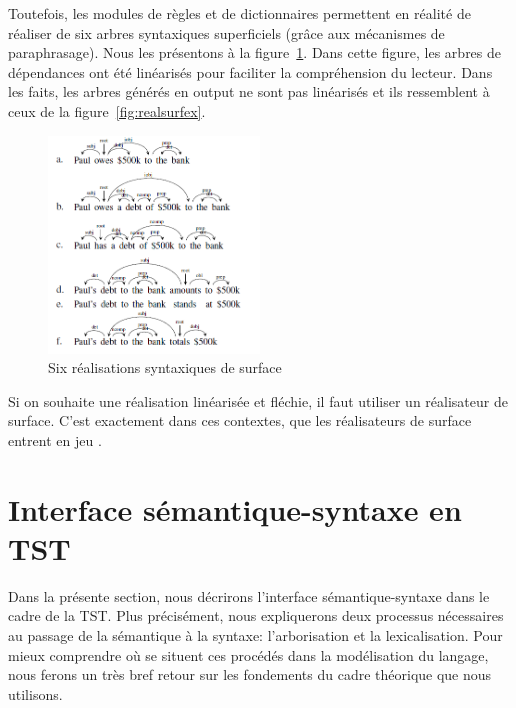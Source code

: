 Toutefois, les modules de règles et de dictionnaires permettent en réalité de réaliser de six arbres syntaxiques superficiels (grâce aux mécanismes de paraphrasage). Nous les présentons à la figure~\ref{fig:6realsurf}. Dans cette figure, les arbres de dépendances ont été linéarisés pour faciliter la compréhension du lecteur. Dans les faits, les arbres générés en output ne sont pas linéarisés et ils ressemblent à ceux de la figure~\ref{fig:realsurfex}.

\begin{figure}[htb]
	\centering
	\includegraphics[width=0.5\textwidth, trim = {0cm 0cm 0cm 0cm},clip]{ch3/figs/exemples_real.png}
	\caption{Six réalisations syntaxiques de surface \citep{lareau18}}
	\label{fig:6realsurf}
\end{figure}

Si on souhaite une réalisation linéarisée et fléchie,  il faut utiliser un réalisateur de surface. C'est exactement dans ces contextes, que les réalisateurs de surface entrent en jeu \citep{DaoustJSREALTextRealizer2015, MolinsJSrealBBilingualText2015, GattSimpleNLGRealisationEngine2009, MilleSharedTaskProposal2017a,BelzFirstSurfaceRealisation2011}.


\section{Interface sémantique-syntaxe en TST}\label{sec:semsynt}

Dans la présente section, nous décrirons l'interface sémantique-syntaxe dans le cadre de la \ac{TST}. Plus précisément, nous expliquerons deux processus nécessaires au passage de la sémantique à la syntaxe: l'arborisation et la lexicalisation. Pour mieux comprendre où se situent ces procédés dans la modélisation du langage, nous ferons un très bref retour sur les fondements du cadre théorique que nous utilisons. 

